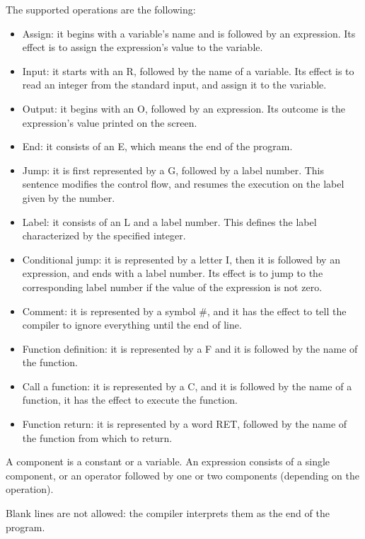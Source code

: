 \documentclass[12pt,spanish]{article}
\begin{document}
\noindent The supported operations are the following:
\begin{itemize}
\item{Assign: it begins with a variable's name and is followed by an expression. Its effect is to assign the expression's value to the variable.}
\item{Input: it starts with an R, followed by the name of a variable. Its effect is to read an integer from the standard input, and assign it to the variable.}
\item{Output: it begins with an O, followed by an expression. Its outcome is the expression's value printed on the screen.}
\item{End: it consists of an E, which means the end of the program.}
\item{Jump: it is first represented by a G, followed by a label number. This sentence modifies the control flow, and resumes the execution on the label given by the number.}
\item{Label: it consists of an L and a label number. This defines the label characterized by the specified integer.}
\item{Conditional jump: it is represented by a letter I, then it is followed by an expression, and ends with a label number. Its effect is to jump to the corresponding label number if the value of the expression is not zero.}
\item{Comment: it is represented by a symbol \#, and it has the effect to tell the compiler to ignore everything until the end of line.}
\item{Function definition: it is represented by a F and it is followed by the name of the function.}
\item{Call a function: it is represented by a C, and it is followed by the name of a function, it has the effect to execute the function.}
\item{Function return: it is represented by a word RET, followed by the name of the function from which to return.}
\end{itemize}

\noindent A component is a constant or a variable. An expression consists of a single component, or an operator followed by one or two components (depending on the operation).

\noindent Blank lines are not allowed: the compiler interprets them as the end of the program.
\end{document}
